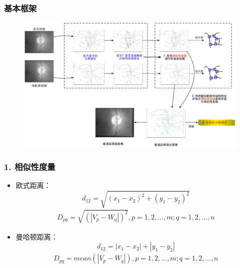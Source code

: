 \documentclass[notheorems,mathserif,table,compress]{beamer}  %
\begin{document}
\begin{frame}
\frametitle{基本框架}
\begin{figure}
  \centering
  \includegraphics[width=1\textwidth]{chap03/framework}
  \caption*{\color{blue}{基本框架}}
\end{figure}
\end{frame}

\begin{frame}
\frametitle{1. 相似性度量}
\begin{itemize}
\item 欧式距离：
\begin{equation}
d_{12}=\sqrt{(x_1-x_2)^2+(y_1-y_2)^2}
\end{equation}
\begin{align}
D_{pq} = \sqrt{(|V_p-W_q|)^2}, p = 1, 2, \ldots, m; q = 1, 2, \ldots, n
\end{align}
\item 曼哈顿距离：
\begin{equation}
d_{12}=|x_1-x_2|+|y_1-y_2| 
\end{equation}
\begin{align}
D_{pq} = mean(|V_p-W_q|), p = 1, 2, \ldots, m; q = 1, 2, \ldots, n
\end{align}
\begin{center}
\color{red} 
\end{center}
\end{itemize}
\end{frame}
\end{document}

